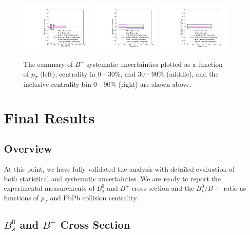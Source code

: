 \begin{figure}[hbtp]
\begin{center}
\includegraphics[width=0.32\textwidth]{Figures/Chapter5/BpPtSyst.pdf}
\includegraphics[width=0.32\textwidth]{Figures/Chapter5/BpCentSyst.pdf}
\includegraphics[width=0.32\textwidth]{Figures/Chapter5/BpIncSyst.pdf}
\caption{The summary of $B^+$ systematic uncertainties plotted as a function of $p_T$ (left), centrality in 0 - 30\%, and 30 - 90\% (middle), and the inclusive centrality bin 0 - 90\% (right) are shown above.}
\label{BPSystSumPlot}
\end{center}
\end{figure}

\clearpage

\section{Final Results} 

\subsection{Overview}

At this point, we have fully validated the analysis with detailed evaluation of both statistical and systematic uncertainties. We are ready to report the experimental measurements of $B^0_s$ and $B^+$ cross section and the $B^0_s/B+$ ratio as functions of $p_T$ and PbPb collision centrality.

\subsection{$B^0_s$ and $B^{+}$ Cross Section}

